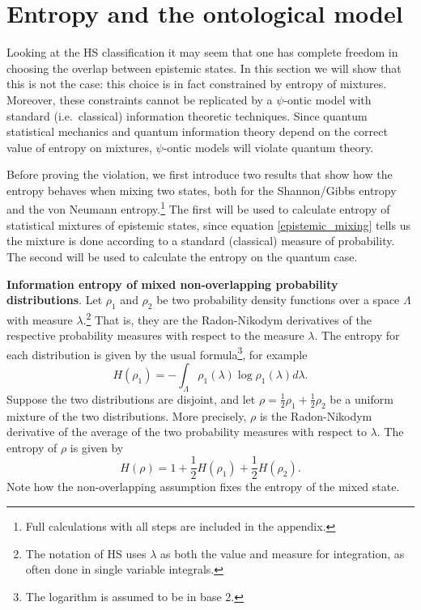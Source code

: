 \documentclass[10pt,twocolumn, nofootinbib]{revtex4-2}
\begin{document}
\section{Entropy and the ontological model}

Looking at the HS classification it may seem that one has complete freedom in choosing the overlap between epistemic states. In this section we will show that this is not the case: this choice is in fact constrained by entropy of mixtures. Moreover, these constraints cannot be replicated by a $\psi$-ontic model with standard (i.e.\ classical) information theoretic techniques. Since quantum statistical mechanics and quantum information theory depend on the correct value of entropy on mixtures, $\psi$-ontic models will violate quantum theory.

Before proving the violation, we first introduce two results that show how the entropy behaves when mixing two states, both for the Shannon/Gibbs entropy and the von Neumann entropy.\footnote{Full calculations with all steps are included in the appendix.} The first will be used to calculate entropy of statistical mixtures of epistemic states, since equation \ref{epistemic_mixing} tells us the mixture is done according to a standard (classical) measure of probability. The second will be used to calculate the entropy on the quantum case.

\textbf{Information entropy of mixed non-overlapping probability distributions}. Let $\rho_1$ and $\rho_2$ be two probability density functions over a space $\Lambda$ with measure $\lambda$.\footnote{The notation of HS uses $\lambda$ as both the value and measure for integration, as often done in single variable integrals.} That is, they are the Radon-Nikodym derivatives of the respective probability measures with respect to the measure $\lambda$. The entropy for each distribution is given by the usual formula\footnote{The logarithm is assumed to be in base 2.}, for example
\begin{equation}\label{shannon_entropy}
	H(\rho_1) = - \int_\Lambda \rho_1(\lambda) \log \rho_1(\lambda) d\lambda.
\end{equation}
Suppose the two distributions are disjoint, and let $\rho = \frac{1}{2} \rho_1 + \frac{1}{2} \rho_2$ be a uniform mixture of the two distributions. More precisely, $\rho$ is the Radon-Nikodym derivative of the average of the two probability measures with respect to $\lambda$. The entropy of $\rho$ is given by
\begin{equation}\label{entropy_nonoverlap}
	H(\rho) = 1 + \frac{1}{2} H(\rho_1) + \frac{1}{2} H(\rho_2).
\end{equation}
Note how the non-overlapping assumption fixes the entropy of the mixed state. 
\end{document}
